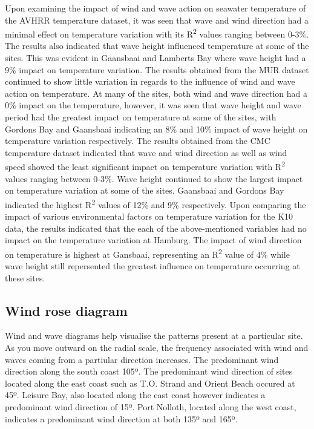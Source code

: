 \documentclass[12pt,a4paper,]{article}
\begin{document}
Upon examining the impact of wind and wave action on seawater
temperature of the AVHRR temperature dataset, it was seen that wave and
wind direction had a minimal effect on temperature variation with its
R\textsuperscript{2} values ranging between 0-3\%. The results also
indicated that wave height influenced temperature at some of the sites.
This was evident in Gaansbaai and Lamberts Bay where wave height had a
9\% impact on temperature variation. The results obtained from the MUR
dataset continued to show little variation in regards to the influence
of wind and wave action on temperature. At many of the sites, both wind
and wave direction had a 0\% impact on the temperature, however, it was
seen that wave height and wave period had the greatest impact on
temperature at some of the sites, with Gordons Bay and Gaansbaai
indicating an 8\% and 10\% impact of wave height on temperature
variation respectively. The results obtained from the CMC temperature
dataset indicated that wave and wind direction as well as wind speed
showed the least significant impact on temperature variation with
R\textsuperscript{2} values ranging between 0-3\%. Wave height continued
to show the largest impact on temperature variation at some of the
sites. Gaansbaai and Gordons Bay indicated the highest
R\textsuperscript{2} values of 12\% and 9\% respectively. Upon comparing
the impact of various environmental factors on temperature variation for
the K10 data, the results indicated that the each of the above-mentioned
variables had no impact on the temperature variation at Hamburg. The
impact of wind direction on temperature is highest at Gansbaai,
representing an R\textsuperscript{2} value of 4\% while wave height
still repersented the greatest influence on temperature occurring at
these sites.

\hypertarget{wind-rose-diagram}{%
\subsection{Wind rose diagram}\label{wind-rose-diagram}}

Wind and wave diagrams help visualise the patterns present at a
particular site. As you move outward on the radial scale, the frequency
associated with wind and waves coming from a partiular direction
increases. The predominant wind direction along the south coast 105º.
The predominant wind direction of sites located along the east coast
such as T.O. Strand and Orient Beach occured at 45º. Leisure Bay, also
located along the east coast however indicates a predominant wind
direction of 15º. Port Nolloth, located along the west coast, indicates
a predominant wind direction at both 135º and 165º.
\end{document}
